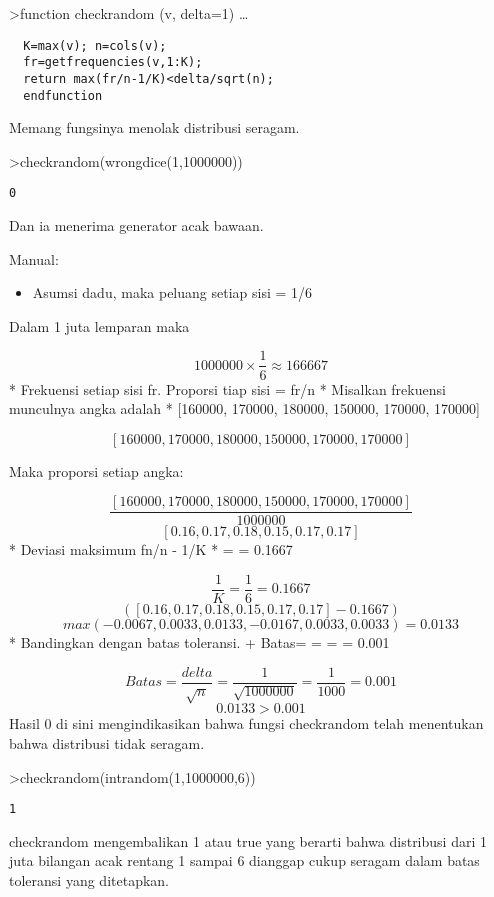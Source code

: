 \documentclass[
]{book}
\providecommand{\tightlist}{%
  \setlength{\itemsep}{0pt}\setlength{\parskip}{0pt}}
\begin{document}
\textgreater function checkrandom (v, delta=1) \ldots{}

\begin{verbatim}
  K=max(v); n=cols(v);
  fr=getfrequencies(v,1:K);
  return max(fr/n-1/K)<delta/sqrt(n);
  endfunction
\end{verbatim}

Memang fungsinya menolak distribusi seragam.

\textgreater checkrandom(wrongdice(1,1000000))

\begin{verbatim}
0
\end{verbatim}

Dan ia menerima generator acak bawaan.

Manual:

\begin{itemize}
\tightlist
\item
  Asumsi dadu, maka peluang setiap sisi = 1/6
\end{itemize}

Dalam 1 juta lemparan maka

\[1000000 \times \frac{1}{6} \approx 166667\]* Frekuensi setiap sisi fr. Proporsi tiap sisi = fr/n * Misalkan frekuensi munculnya angka adalah * {[}160000, 170000, 180000, 150000, 170000, 170000{]}

\[[160000, 170000, 180000, 150000, 170000, 170000]\]

Maka proporsi setiap angka:

\[\frac{[160000, 170000, 180000, 150000, 170000, 170000]}{1000000}\] \[[0.16, 0.17, 0.18, 0.15, 0.17, 0.17]\]* Deviasi maksimum fn/n - 1/K *  =  = 0.1667

\[\frac{1}{K} = \frac{1}{6} = 0.1667\] \[([0.16, 0.17, 0.18, 0.15, 0.17, 0.17]-0.1667)\] \[max(-0.0067, 0.0033, 0.0133, -0.0167, 0.0033, 0.0033)= 0.0133\]* Bandingkan dengan batas toleransi. + Batas=  =  =  = 0.001

\[Batas= \frac{delta}{\sqrt{n}} = \frac{1}{\sqrt{1000000}} = \frac{1}{1000} = 0.001\] \[0.0133>0.001\]Hasil 0 di sini mengindikasikan bahwa fungsi checkrandom telah menentukan bahwa distribusi tidak seragam.

\textgreater checkrandom(intrandom(1,1000000,6))

\begin{verbatim}
1
\end{verbatim}

checkrandom mengembalikan 1 atau true yang berarti bahwa distribusi dari 1 juta bilangan acak rentang 1 sampai 6 dianggap cukup seragam dalam batas toleransi yang ditetapkan.
\end{document}
